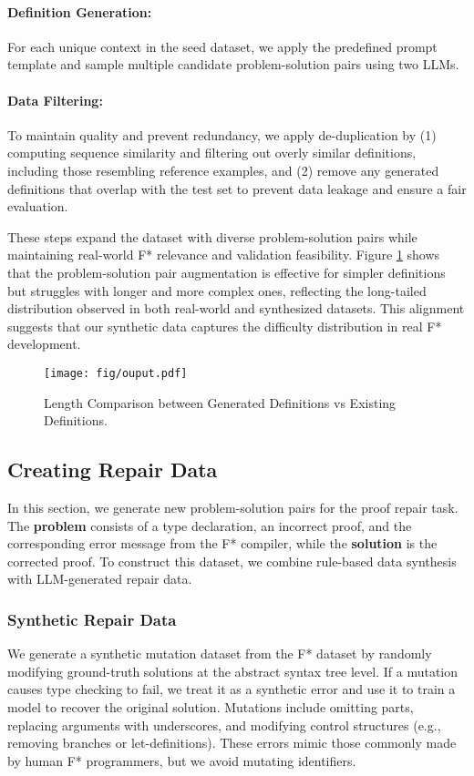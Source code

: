 \paragraph{Definition Generation:} For each unique context in the seed dataset, we apply the predefined prompt template and sample multiple candidate problem-solution pairs using two LLMs.

\paragraph{Data Filtering:} To maintain quality and prevent redundancy, we apply de-duplication by (1) computing sequence similarity and filtering out overly similar definitions, including those resembling reference examples, and (2) remove any generated definitions that overlap with the test set to prevent data leakage and ensure a fair evaluation. 

These steps expand the dataset with diverse problem-solution pairs while maintaining real-world F* relevance and validation feasibility. Figure \ref{fig:length} shows that the problem-solution pair augmentation is effective for simpler definitions but struggles with longer and more complex ones, reflecting the long-tailed distribution observed in both real-world and synthesized datasets. This alignment suggests that our synthetic data captures the difficulty distribution in real F* development.


\begin{figure}
    \centering
    \texttt{[image: fig/ouput.pdf]}
    \caption{Length Comparison between Generated Definitions vs Existing Definitions.}
    \label{fig:length}
\end{figure}

\subsection{Creating Repair Data}

In this section, we generate new problem-solution pairs for the proof repair task. The \textbf{problem} consists of a type declaration, an incorrect proof, and the corresponding error message from the F* compiler, while the \textbf{solution} is the corrected proof. To construct this dataset, we combine rule-based data synthesis with LLM-generated repair data.

\subsubsection{Synthetic Repair Data} \label{Synthetic Repair Data}
We generate a synthetic mutation dataset from the F* dataset by randomly modifying ground-truth solutions at the abstract syntax tree level. If a mutation causes type checking to fail, we treat it as a synthetic error and use it to train a model to recover the original solution. Mutations include omitting parts, replacing arguments with underscores, and modifying control structures (e.g., removing branches or let-definitions). These errors mimic those commonly made by human F* programmers, but we avoid mutating identifiers.
